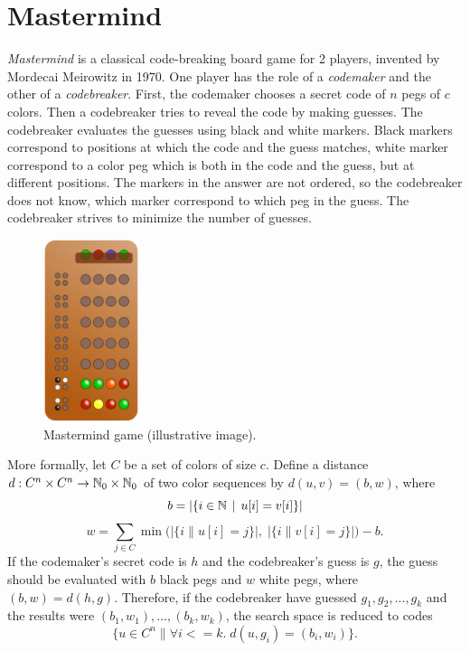 \section{Mastermind}

\emph{Mastermind} is a classical code-breaking board game for 2 players,
  invented by Mordecai Meirowitz in 1970.
One player has the role of a \emph{codemaker} and the other of a \emph{codebreaker}.
First, the codemaker chooses a secret code of $n$ pegs of $c$ colors.
Then a codebreaker tries to reveal the code by making guesses.
The codebreaker evaluates the guesses using black and white markers.
Black markers correspond to positions at which the code and the guess matches,
  white marker correspond to a color peg which is both in the code and the guess,
  but at different positions.
The markers in the answer are not ordered, so the codebreaker does not know,
  which marker correspond to which peg in the guess.
The codebreaker strives to minimize the number of guesses.

\begin{figure}
  \vspace{-10mm}
  \begin{center}
  \includegraphics[width=0.25\textwidth]{pictures/mastermind.png}
  \vspace{-5mm}
  \end{center}
  \caption{Mastermind game (illustrative image)\protect\footnotemark.}
  \vspace{15mm}
\end{figure}

More formally, let $C$ be a set of colors of size $c$.
Define a distance $d : C^n\times C^n -> \mathbb{N}_0\times\mathbb{N}_0$
  of two color sequences by $d(u, v) = (b, w)$, where
\[
b = |\{ i \in\mathbb{N} \:\:|\:\: u[i] = v[i] \}|
\]
\[
w = \sum_{j\in C} \min\big(\big|\{ i \| u[i] = j \}\big|,\;
                           \big|\{ i \| v[i] = j\}\big|\big)  - b.
\]
If the codemaker's secret code is $h$ and the codebreaker's guess is $g$,
  the guess should be evaluated with $b$ black pegs and $w$ white pegs, where
  $(b,w) = d(h,g)$.
Therefore, if the codebreaker have guessed $g_1, g_2, ..., g_k$ and the results
  were $(b_1,w_1), ..., (b_k, w_k)$,
  the search space is reduced to codes
  \[
  \{ u\in C^n \| \forall i<=k.\; d(u, g_i) = (b_i,w_i)\}.
  \]

